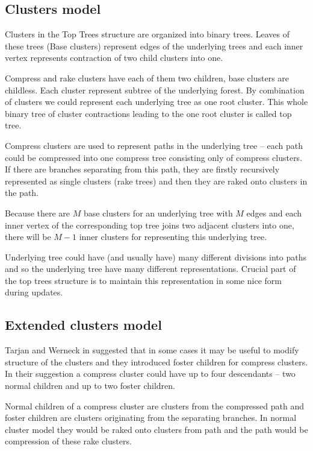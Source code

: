 \subsection{Clusters model}

Clusters in the Top Trees structure are organized into binary trees. Leaves of
these trees (Base clusters) represent edges of the underlying trees and each
inner vertex represents contraction of two child clusters into one.

Compress and rake clusters have each of them two children, base clusters are
childless. Each cluster represent subtree of the underlying forest. By
combination of clusters we could represent each underlying tree as one {\I root
cluster}. This whole binary tree of cluster contractions leading to the one root
cluster is called {\I top tree}.

Compress clusters are used to represent paths in the underlying tree -- each
path could be compressed into one {\I compress tree} consisting only of compress
clusters. If there are branches separating from this path, they are firstly
recursively represented as single clusters ({\I rake trees}) and then they are
{\I raked onto} clusters in the path.

Because there are $M$ base clusters for an underlying tree with $M$ edges and
each inner vertex of the corresponding top tree joins two adjacent clusters into
one, there will be $M-1$ inner clusters for representing this underlying tree.

Underlying tree could have (and usually have) many different divisions into
paths and so the underlying tree have many different representations. Crucial
part of the top trees structure is to maintain this representation in some nice
form during updates.

\subsection{Extended clusters model}

Tarjan and Werneck in \cite{SelfAdjustingTT} suggested that in some cases it may
be useful to modify structure of the clusters and they introduced
{\I foster children} for {\I compress clusters}. In their suggestion a compress
cluster could have up to four descendants -- two normal children and up to two
foster children.

Normal children of a compress cluster are clusters from the compressed path and
foster children are clusters originating from the separating branches. In normal
cluster model they would be raked onto clusters from path and the path would be
compression of these rake clusters.

